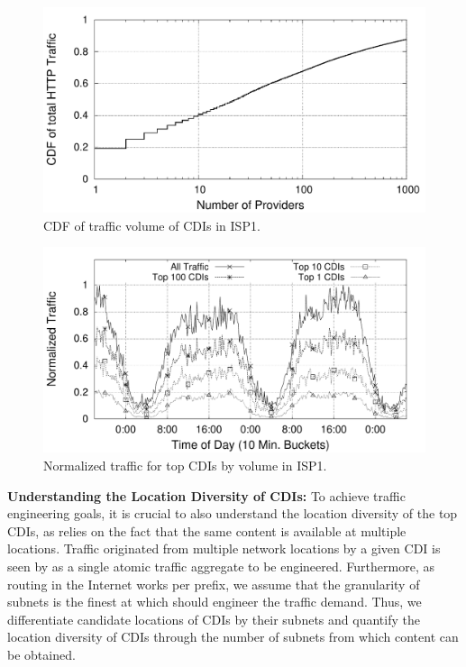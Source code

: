 \begin{figure}[tbp]
\center\includegraphics[width=1\linewidth]{figures-pdf/providersVsVolume}
\caption{CDF of traffic volume of CDIs in ISP1.}
\label{fig:CDF-Traffic-CPs}
\vspace{-1.5em}
\end{figure}


\begin{figure}[tbp]
\center\includegraphics[width=1\linewidth]{figures-pdf/Volume_timeseries}
\caption{Normalized traffic for top CDIs by volume in ISP1.}
\label{fig:CPs-Total-Traffic}
\vspace{-1.5em}
\end{figure}



\noindent\textbf{Understanding the Location Diversity of CDIs:}\label{sec:Traffic-by-Content-Provider}
To achieve traffic engineering goals, it is crucial to also understand the
location diversity of the top CDIs, as \cate relies on the fact that the same
content is available at multiple locations.  Traffic originated from multiple
network locations by a given CDI is seen by \cate as a single atomic traffic
aggregate to be engineered. Furthermore, as routing in the Internet works per
prefix, we assume that the granularity of subnets is the finest at which \cate
should engineer the traffic demand. Thus, we differentiate candidate locations
of CDIs by their subnets and quantify the location diversity of CDIs through the
number of subnets from which content can be obtained.

